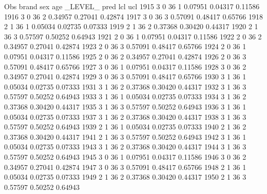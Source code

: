 \documentclass{article}
\begin{document}
\begin{Woutput}
 Obs    brand    sex    age    _LEVEL_      pred       lcl        ucl
1915      3       0      36       1       0.07951    0.04317    0.11586
1916      3       0      36       2       0.34957    0.27041    0.42874
1917      3       0      36       3       0.57091    0.48417    0.65766
1918      2       1      36       1       0.05034    0.02735    0.07333
1919      2       1      36       2       0.37368    0.30420    0.44317
1920      2       1      36       3       0.57597    0.50252    0.64943
1921      2       0      36       1       0.07951    0.04317    0.11586
1922      2       0      36       2       0.34957    0.27041    0.42874
1923      2       0      36       3       0.57091    0.48417    0.65766
1924      2       0      36       1       0.07951    0.04317    0.11586
1925      2       0      36       2       0.34957    0.27041    0.42874
1926      2       0      36       3       0.57091    0.48417    0.65766
1927      3       0      36       1       0.07951    0.04317    0.11586
1928      3       0      36       2       0.34957    0.27041    0.42874
1929      3       0      36       3       0.57091    0.48417    0.65766
1930      3       1      36       1       0.05034    0.02735    0.07333
1931      3       1      36       2       0.37368    0.30420    0.44317
1932      3       1      36       3       0.57597    0.50252    0.64943
1933      3       1      36       1       0.05034    0.02735    0.07333
1934      3       1      36       2       0.37368    0.30420    0.44317
1935      3       1      36       3       0.57597    0.50252    0.64943
1936      3       1      36       1       0.05034    0.02735    0.07333
1937      3       1      36       2       0.37368    0.30420    0.44317
1938      3       1      36       3       0.57597    0.50252    0.64943
1939      2       1      36       1       0.05034    0.02735    0.07333
1940      2       1      36       2       0.37368    0.30420    0.44317
1941      2       1      36       3       0.57597    0.50252    0.64943
1942      3       1      36       1       0.05034    0.02735    0.07333
1943      3       1      36       2       0.37368    0.30420    0.44317
1944      3       1      36       3       0.57597    0.50252    0.64943
1945      3       0      36       1       0.07951    0.04317    0.11586
1946      3       0      36       2       0.34957    0.27041    0.42874
1947      3       0      36       3       0.57091    0.48417    0.65766
1948      2       1      36       1       0.05034    0.02735    0.07333
1949      2       1      36       2       0.37368    0.30420    0.44317
1950      2       1      36       3       0.57597    0.50252    0.64943

\end{Woutput}
\end{document}
